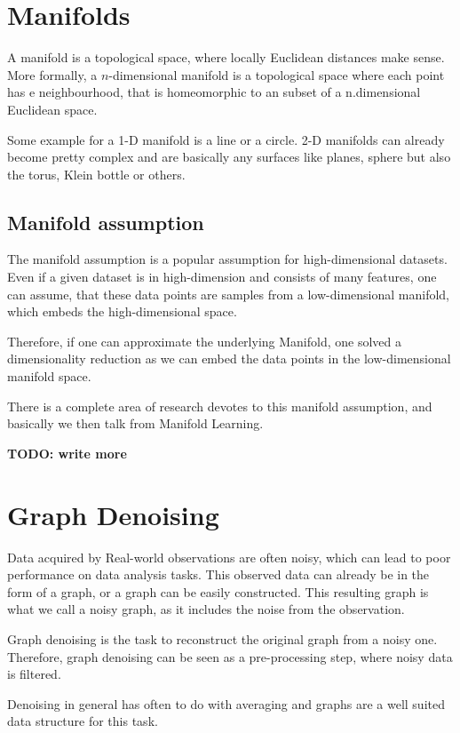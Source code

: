 \section{Manifolds}
A manifold is a topological space, where locally Euclidean distances make sense.
More formally, a $n$-dimensional manifold is a topological space where
each point has e neighbourhood, that is homeomorphic to an subset of a n.dimensional
Euclidean space.

Some example for a 1-D manifold is a line or a circle. 2-D manifolds can already become 
pretty complex and are basically any surfaces like planes, sphere but also the torus,
Klein bottle or others.

\subsection{Manifold assumption}
The manifold assumption is a popular assumption for high-dimensional datasets.
Even if a given dataset is in high-dimension and consists of many features, one can assume,
that these data points are samples from a low-dimensional manifold, 
which embeds the high-dimensional space.

Therefore, if one can approximate the underlying Manifold, one solved a dimensionality reduction
as we can embed the data points in the low-dimensional manifold space.

There is a complete area of research devotes to this manifold assumption, and basically
we then talk from Manifold Learning. 

\textbf{TODO: write more} \cite{ManifoldLearning}

\section{Graph Denoising}
Data acquired by Real-world observations are often noisy, which can lead to poor 
performance on data analysis tasks. This observed data can already be in the form of a graph,
or a graph can be easily constructed. This resulting graph is what we call
a noisy graph, as it includes the noise from the observation.

Graph denoising is the task to reconstruct the original graph from a noisy one.
Therefore, graph denoising can be seen as a pre-processing step, where noisy data is filtered.

Denoising in general has often to do with averaging 
 and graphs are  a well suited data structure for this task\cite{noneLocalMean}.


